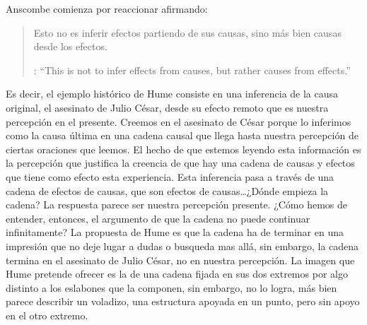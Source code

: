 Anscombe comienza por reaccionar afirmando: \blockquote[{\cite[86]{anscombe1981parmenides:humeandjulius}}: \enquote{This is not to infer effects from causes, but rather causes from effects.}]{Esto no es inferir efectos partiendo de sus causas, sino más bien causas desde los efectos.} Es decir, el ejemplo histórico de Hume consiste en una inferencia de la causa original, el asesinato de Julio César, desde su efecto remoto que es nuestra percepción en el presente. Creemos en el asesinato de César porque lo inferimos como la causa última en una cadena causal que llega hasta nuestra percepción de ciertas oraciones que leemos. El hecho de que estemos leyendo esta información es la percepción que justifica la creencia de que hay una cadena de causas y efectos que tiene como efecto esta experiencia. Esta inferencia pasa a través de una cadena de efectos de causas, que son efectos de causas\ldots ¿Dónde empieza la cadena? La respuesta parece ser nuestra percepción presente. ¿Cómo hemos de entender, entonces, el argumento de que la cadena no puede continuar infinitamente? La propuesta de Hume es que la cadena ha de terminar en una impresión que no deje lugar a dudas o busqueda mas allá, sin embargo, la cadena termina en el asesinato de Julio César, no en nuestra percepción. La imagen que Hume pretende ofrecer es la de una cadena fijada en sus dos extremos por algo distinto a los eslabones que la componen, sin embargo, no lo logra, más bien parece describir un voladizo, una estructura apoyada en un punto, pero sin apoyo en el otro extremo.


